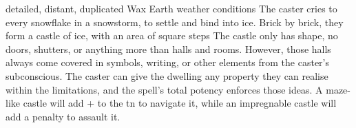  {detailed, distant, duplicated}%
  {Wax}%
  {Earth}%
  {weather conditions}%
  {The caster cries to every snowflake in a snowstorm, to settle and bind into ice.
    Brick by brick, they form a castle of ice, with an area of  square \glspl{step}}%
  {
    The castle only has shape, no doors, shutters, or anything more than halls and rooms.
    However, those halls always come covered in symbols, writing, or other elements from the caster's subconscious.
    The caster can give the dwelling any property they can realise within the limitations, and the spell's total potency enforces those ideas.
    A maze-like castle will add + to the \gls{tn} to navigate it, while an impregnable castle will add a penalty to assault it.
  }

